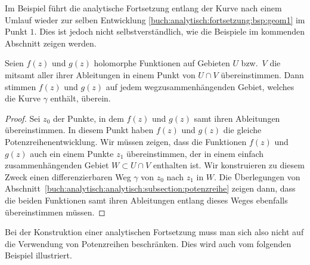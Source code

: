 Im Beispiel führt die analytische Fortsetzung entlang der Kurve 
nach einem Umlauf wieder zur selben Entwicklung
\eqref{buch:analytisch:fortsetzung:bsp:geom1}
im Punkt $1$.
Dies ist jedoch nicht selbstverständlich, wie die Beispiele
im kommenden Abschnitt zeigen werden.


\begin{satz}
Seien $f(z)$ und $g(z)$ holomorphe Funktionen auf Gebieten $U$
bzw.~$V$ die mitsamt aller ihrer Ableitungen in einem Punkt
von $U\cap V$ übereinstimmen.
Dann stimmen $f(z)$ und $g(z)$ auf jedem wegzusammenhängenden
Gebiet, welches die Kurve $\gamma$ enthält, überein.
\end{satz}

\begin{proof}
Sei $z_0$ der Punkte, in dem $f(z)$ und $g(z)$ samt ihren
Ableitungen übereinstimmen.
In diesem Punkt haben $f(z)$ und $g(z)$ die gleiche Potenzreihenentwicklung.
Wir müssen zeigen, dass die Funktionen $f(z)$ und $g(z)$ auch ein einem
Punkte $z_1$ übereinstimmen, der in einem einfach zusammenhängenden Gebiet
$W\subset U\cap V$ enthalten ist.
Wir konstruieren zu diesem Zweck einen differenzierbaren Weg $\gamma$
von $z_0$ nach $z_1$ in $W$.
Die Überlegungen von
Abschnitt~\ref{buch:analytisch:analytisch:subsection:potenzreihe}
zeigen dann, dass die beiden Funktionen samt ihren Ableitungen entlang
dieses Weges ebenfalls übereinstimmen müssen.
\end{proof}

Bei der Konstruktion einer analytischen Fortsetzung muss man sich also
nicht auf die Verwendung von Potenzreihen beschränken.
Dies wird auch vom folgenden Beispiel illustriert.

